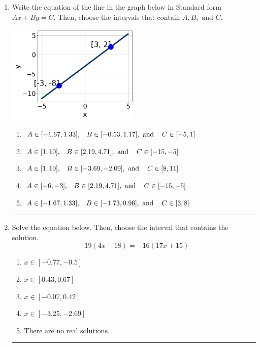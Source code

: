 \documentclass[14pt]{extbook}
\newcommand{\litem}[1]{\item#1\hspace*{-1cm}\rule{\textwidth}{0.4pt}}
\begin{document}
\begin{enumerate}
{\begin{enumerate}[label=\Alph*.]
\end{enumerate} }
\litem{
Write the equation of the line in the graph below in Standard form $Ax+By=C$. Then, choose the intervals that contain $A, B, \text{ and } C$.
\begin{center}
    \includegraphics[width=0.5\textwidth]{../Figures/linearGraphToStandardC.png}
\end{center}
\begin{enumerate}[label=\Alph*.]
\item \( A \in [-1.67, 1.33], \hspace{3mm} B \in [-0.53, 1.17], \text{ and } \hspace{3mm} C \in [-5, 1] \)
\item \( A \in [1, 10], \hspace{3mm} B \in [2.19, 4.71], \text{ and } \hspace{3mm} C \in [-15, -5] \)
\item \( A \in [1, 10], \hspace{3mm} B \in [-3.69, -2.09], \text{ and } \hspace{3mm} C \in [8, 11] \)
\item \( A \in [-6, -3], \hspace{3mm} B \in [2.19, 4.71], \text{ and } \hspace{3mm} C \in [-15, -5] \)
\item \( A \in [-1.67, 1.33], \hspace{3mm} B \in [-1.73, 0.96], \text{ and } \hspace{3mm} C \in [3, 8] \)

\end{enumerate} }
\litem{
Solve the equation below. Then, choose the interval that contains the solution.\[ -19(4x -18) = -16(17x + 15) \]\begin{enumerate}[label=\Alph*.]
\item \( x \in [-0.77, -0.5] \)
\item \( x \in [0.43, 0.67] \)
\item \( x \in [-0.07, 0.42] \)
\item \( x \in [-3.25, -2.69] \)
\item \( \text{There are no real solutions.} \)


\end{enumerate}}
\end{enumerate}
\end{document}
